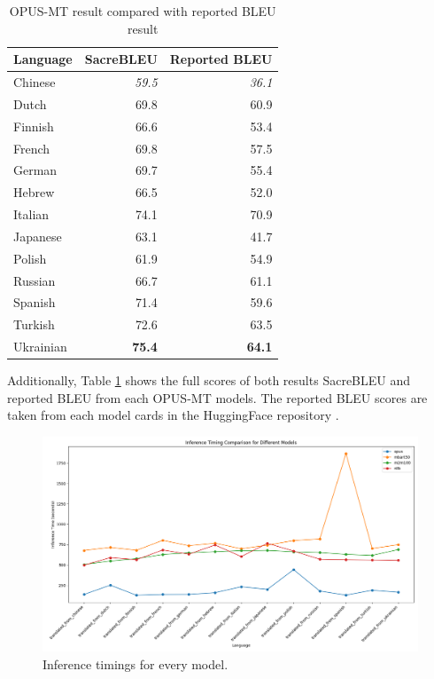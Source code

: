 \documentclass[a4paper]{article}
\begin{document}
\begin{table}[htbp]
    \centering
    \begin{tabular}{|l|r|r|}
        \hline
        \textbf{Language} & \textbf{SacreBLEU} & \textbf{Reported BLEU} \\
        \hline
        Chinese           & \textit{59.5}      & \textit{36.1}          \\
        Dutch             & 69.8               & 60.9                   \\
        Finnish           & 66.6               & 53.4                   \\
        French            & 69.8               & 57.5                   \\
        German            & 69.7               & 55.4                   \\
        Hebrew            & 66.5               & 52.0                   \\
        Italian           & 74.1               & 70.9                   \\
        Japanese          & 63.1               & 41.7                   \\
        Polish            & 61.9               & 54.9                   \\
        Russian           & 66.7               & 61.1                   \\
        Spanish           & 71.4               & 59.6                   \\
        Turkish           & 72.6               & 63.5                   \\
        Ukrainian         & \textbf{75.4}      & \textbf{64.1}          \\
        \hline
    \end{tabular}
    \caption{OPUS-MT result compared with reported BLEU result}
    \label{table:opus_comparison}
\end{table}

Additionally, Table \ref{table:opus_comparison} shows the full scores of both results SacreBLEU and reported BLEU from each OPUS-MT models. The reported BLEU scores are taken from each model cards in the HuggingFace repository \cite{huggingface}.

\begin{figure}[htbp]
    \centering
    \includegraphics[width=0.9\linewidth]{figures/inference_timings.png}
    \caption{Inference timings for every model.}
    \label{fig:inference_timings}
\end{figure}
\end{document}
